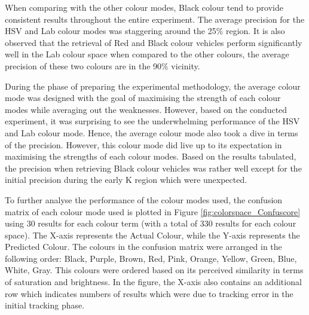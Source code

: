 When comparing with the other colour modes, Black colour tend to provide consistent results throughout the entire experiment. The average precision for the HSV and Lab colour modes was staggering around the 25\% region. It is also observed that the retrieval of Red and Black colour vehicles perform significantly well in the Lab colour space when compared to the other colours, the average precision of these two colours are in the 90\% vicinity. 

During the phase of preparing the experimental methodology, the average colour mode was designed with the goal of maximising the strength of each colour modes while averaging out the weaknesses. However, based on the conducted experiment, it was surprising to see the underwhelming performance of the HSV and Lab colour mode. Hence, the average colour mode also took a dive in terms of the precision. However, this colour mode did live up to its expectation in maximising the strengths of each colour modes. Based on the results tabulated, the precision when retrieving Black colour vehicles was rather well except for the initial precision during the early K region which were unexpected. 

To further analyse the performance of the colour modes used, the confusion matrix of each colour mode used is plotted in Figure \ref{fig:colorspace_Confuscore} using 30 results for each colour term (with a total of 330 results for each colour space). The X-axis represents the Actual Colour, while the Y-axis represents the Predicted Colour. The colours in the confusion matrix were arranged in the following order: Black, Purple, Brown, Red, Pink, Orange, Yellow, Green, Blue, White, Gray. This colours were ordered based on its perceived similarity in terms of saturation and brightness. In the figure, the X-axis also contains an additional row which indicates numbers of results which were due to tracking error in the initial tracking  phase.

